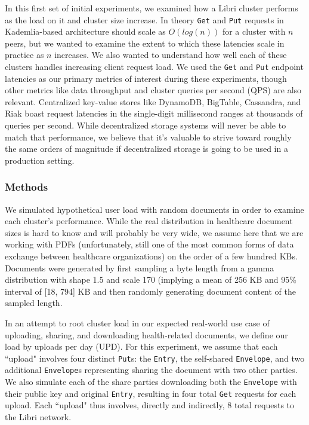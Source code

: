 \documentclass[10pt]{article}
\newcommand{\ttt}[1]{\texttt{#1}}
\def\Entry{\ttt{Entry}}
\def\Envelope{\ttt{Envelope}}
\begin{document}
In this first set of initial experiments, we examined how a Libri cluster performs as the load on it and cluster size increase. In theory \ttt{Get} and \texttt{Put} requests in Kademlia-based architecture should scale as $O(log(n))$ for a cluster with $n$ peers, but we wanted to examine the extent to which these latencies scale in practice as $n$ increases. We also wanted to understand how well each of these clusters handles increasing client request load. We used the \texttt{Get} and \texttt{Put} endpoint latencies as our primary metrics of interest during these experiments, though other metrics like data throughput and cluster queries per second (QPS) are also relevant. Centralized key-value stores like DynamoDB, BigTable, Cassandra, and Riak boast request latencies in the single-digit millisecond ranges at thousands of queries per second. While decentralized storage systems will never be able to match that performance, we believe that it's valuable to strive toward roughly the same orders of magnitude if decentralized storage is going to be used in a production setting. 

\subsubsection{Methods}
We simulated hypothetical user load with random documents in order to examine each cluster's performance. While the real distribution in healthcare document sizes is hard to know and will probably be very wide, we assume here that we are working with PDFs (unfortunately, still one of the most common forms of data exchange between healthcare organizations) on the order of a few hundred KBs. Documents were generated by first sampling a byte length from a gamma distribution with shape 1.5 and scale 170 (implying a mean of 256 KB and 95\% interval of [18, 794] KB and then randomly generating document content of the sampled length.

In an attempt to root cluster load in our expected real-world use case of uploading, sharing, and downloading health-related documents, we define our load by uploads per day (UPD). For this experiment, we assume that each ``upload" involves four distinct \ttt{Put}s: the \Entry{}, the self-shared \Envelope{}, and two additional \Envelope{}s representing sharing the document with two other parties. We also simulate each of the share parties downloading both the \Envelope{} with their public key and original \Entry{}, resulting in four total \texttt{Get} requests for each upload. Each ``upload" thus involves, directly and indirectly, 8 total requests to the Libri network. 
\end{document}
